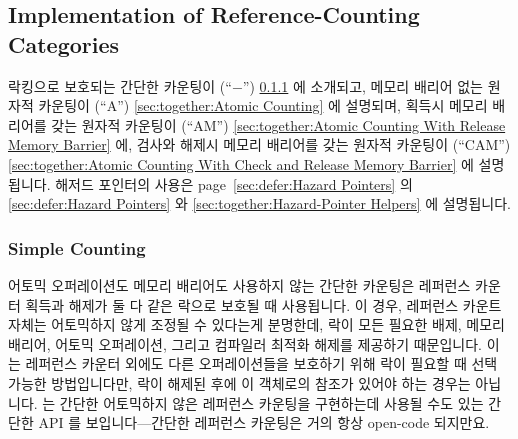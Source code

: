 \fi

\subsection{Implementation of Reference-Counting Categories}
\label{sec:together:Implementation of Reference-Counting Categories}

락킹으로 보호되는 간단한 카운팅이 (``$-$'')
\cref{sec:together:Simple Counting} 에 소개되고,
메모리 배리어 없는 원자적 카운팅이 (``A'')
\cref{sec:together:Atomic Counting} 에 설명되며,
획득시 메모리 배리어를 갖는 원자적 카운팅이 (``AM'')
\cref{sec:together:Atomic Counting With Release Memory Barrier} 에,
검사와 해제시 메모리 배리어를 갖는 원자적 카운팅이 (``CAM'')
\cref{sec:together:Atomic Counting With Check and Release Memory Barrier} 에
설명됩니다.
해저드 포인터의 사용은
page~\ref{sec:defer:Hazard Pointers} 의
\cref{sec:defer:Hazard Pointers} 와
\cref{sec:together:Hazard-Pointer Helpers}
에 설명됩니다.

\iffalse

Simple counting protected by locking (``$-$'') is described in
\cref{sec:together:Simple Counting},
atomic counting with no memory barriers (``A'') is described in
\cref{sec:together:Atomic Counting},
atomic counting with acquisition memory barrier (``AM'') is described in
\cref{sec:together:Atomic Counting With Release Memory Barrier},
and
atomic counting with check and release memory barrier (``CAM'') is described in
\cref{sec:together:Atomic Counting With Check and Release Memory Barrier}.
Use of hazard pointers is described in
\cref{sec:defer:Hazard Pointers}
on page~\ref{sec:defer:Hazard Pointers}
and in
\cref{sec:together:Hazard-Pointer Helpers}.

\fi

\subsubsection{Simple Counting}
\label{sec:together:Simple Counting}

어토믹 오퍼레이션도 메모리 배리어도 사용하지 않는 간단한 카운팅은 레퍼런스
카운터 획득과 해제가 둘 다 같은 락으로 보호될 때 사용됩니다.
이 경우, 레퍼런스 카운트 자체는 어토믹하지 않게 조정될 수 있다는게 분명한데,
락이 모든 필요한 배제, 메모리 배리어, 어토믹 오퍼레이션, 그리고 컴파일러 최적화
해제를 제공하기 때문입니다.
이는 레퍼런스 카운터 외에도 다른 오퍼레이션들을 보호하기 위해 락이 필요할 때
선택 가능한 방법입니다만, 락이 해제된 후에 이 객체로의 참조가 있어야 하는
경우는 아닙니다.
 는 간단한 어토믹하지 않은
레퍼런스 카운팅을 구현하는데 사용될 수도 있는 간단한 API 를 보입니다---간단한
레퍼런스 카운팅은 거의 항상 open-code 되지만요.

